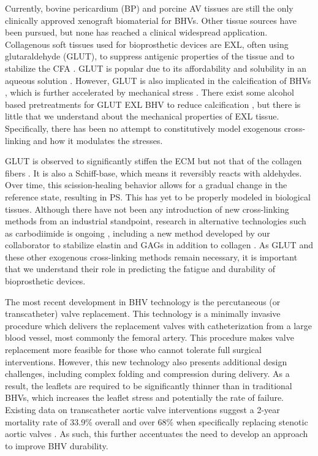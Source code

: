     
    Currently, bovine pericardium (BP) and porcine AV tissues are still the only clinically approved xenograft biomaterial for BHVs. Other tissue sources have been pursued, but none has reached a clinical widespread application. Collagenous soft tissues used for bioprosthetic devices are EXL, often using glutaraldehyde (GLUT), to suppress antigenic properties of the tissue and to stabilize the CFA \cite{khor_methods_1997}. GLUT is popular due to its affordability and solubility in an aqueous solution \cite{jayakrishnan_glutaraldehyde_1996}. However, GLUT is also implicated in the calcification of BHVs \cite{golomb_role_1987}, which is further accelerated by mechanical stress \cite{schoen_calcification_2005}. There exist some alcohol based pretreatments for GLUT EXL BHV to reduce calcification \cite{vyavahare_prevention_1997}, but there is little that we understand about the mechanical properties of EXL tissue. Specifically, there has been no attempt to constitutively model exogenous cross-linking and how it modulates the stresses. 
    
    
    GLUT is observed to significantly stiffen the ECM but not that of the collagen fibers \cite{gentleman_mechanical_2003,yang_mechanical_2008,yang_micromechanical_2007}. It is also a Schiff-base, which means it reversibly reacts with aldehydes. Over time, this scission-healing behavior allows for a gradual change in the reference state, resulting in PS. This has yet to be properly modeled in biological tissues. Although there have not been any introduction of new cross-linking methods from an industrial standpoint, research in alternative technologies such as carbodiimide is ongoing \cite{sung_crosslinking_2003,billiar_effects_2001,kemp_effects_1995}, including a new method developed by our collaborator to stabilize elastin and GAGs in addition to collagen \cite{tam_novel_2015}. As GLUT and these other exogenous cross-linking methods remain necessary, it is important that we understand their role in predicting the fatigue and durability of bioprosthetic devices.
    
    
    The most recent development in BHV technology is the percutaneous (or transcatheter) valve replacement. This technology is a minimally invasive procedure which delivers the replacement valves with catheterization from a large blood vessel, most commonly the femoral artery. This procedure makes valve replacement more feasible for those who cannot tolerate full surgical interventions. However, this new technology also presents additional design challenges, including complex folding and compression during delivery. As a result, the leaflets are required to be significantly thinner than in traditional BHVs, which increases the leaflet stress and potentially the rate of failure. Existing data on transcatheter aortic valve interventions suggest a 2-year mortality rate of 33.9\% overall \cite{mozaffarian_heart_2015} and over 68\% when specifically replacing stenotic aortic valves \cite{makkar_transcatheter_2012}. As such, this further accentuates the need to develop an approach to improve BHV durability. 
    
